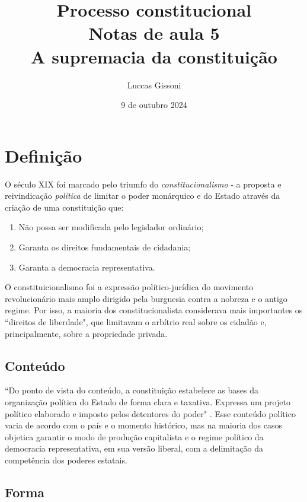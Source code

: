 \documentclass{article}
\title{%
 Processo constitucional \\
  \Large Notas de aula 5 \\
  \large A supremacia da constituição}
\author{Luccas Gissoni}
\date{9 de outubro 2024}
\begin{document}
\maketitle
\tableofcontents

\section{Definição}

O século XIX foi marcado pelo triumfo do \textit{constitucionalismo} - a proposta e reivindicação \textit{política} de limitar o poder monárquico e do Estado através da criação de uma constituição que:

\begin{enumerate}
    \item Não possa ser modificada pelo legislador ordinário;
    \item Garanta os direitos fundamentais de cidadania;
    \item Garanta a democracia representativa.
\end{enumerate}

O constituicionalismo foi a expressão político-jurídica do movimento revolucionário mais amplo dirigido pela burguesia contra a nobreza e o antigo regime. Por isso, a maioria dos constitucionalista considerava mais importantes os ``direitos de liberdade", que limitavam o arbítrio real sobre os cidadão e, principalmente, sobre a propriedade privada.

\subsection{Conteúdo}

``Do ponto de vista do conteúdo, a  constituição estabelece as bases da organização política do Estado de forma clara e taxativa. Expressa um projeto político elaborado e imposto pelos detentores do poder" \cite[p.~19]{dimoulis_curso_2016}. Esse conteúdo político varia de acordo com o país e o momento histórico, mas na maioria dos casos objetica garantir o modo de produção capitalista e o regime político da democracia representativa, em sua versão liberal, com a delimitação da competência dos poderes estatais.

\subsection{Forma}
\end{document}

